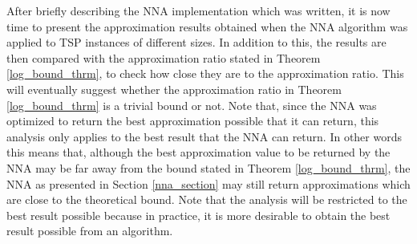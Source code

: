 \documentclass[12pt]{article}
\numberwithin{equation}{subsection}
\numberwithin{table}{subsection}
\numberwithin{algorithm}{subsection}
\numberwithin{figure}{subsection}
\begin{document}
After briefly describing the NNA implementation which was written, it is now time to present the approximation results obtained when the NNA algorithm was applied to TSP instances of different sizes. In addition to this, the results are then compared with the approximation ratio stated in Theorem \ref{log_bound_thrm}, to check how close they are to the approximation ratio. This will eventually suggest whether the approximation ratio in Theorem \ref{log_bound_thrm} is a trivial bound or not. Note that, since the NNA was optimized to return the best approximation possible that it can return, this analysis only applies to the best result that the NNA can return. In other words this means that, although the best approximation value to be returned by the NNA may be far away from the bound stated in Theorem \ref{log_bound_thrm}, the NNA as presented in Section \ref{nna_section} may still return approximations which are close to the theoretical bound. Note that the analysis will be restricted to the best result possible because in practice, it is more desirable to obtain the best result possible from an algorithm.
\end{document}
